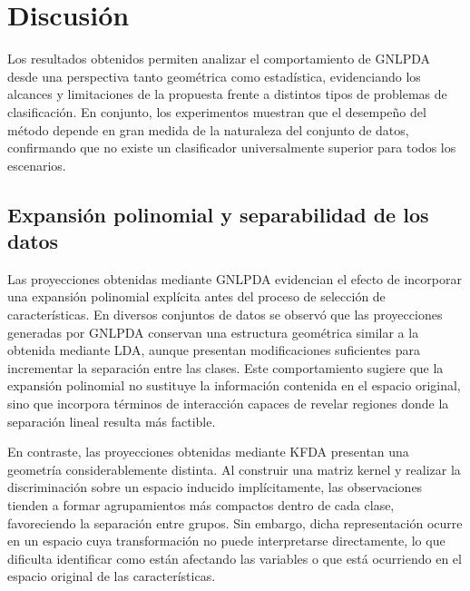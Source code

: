 
\chapter{Discusión}

\label{chap:Discusión}

Los resultados obtenidos permiten analizar el comportamiento de GNLPDA desde una perspectiva tanto geométrica como estadística, evidenciando los alcances y limitaciones de la propuesta frente a distintos tipos de problemas de clasificación. En conjunto, los experimentos muestran que el desempeño del método depende en gran medida de la naturaleza del conjunto de datos, confirmando que no existe un clasificador universalmente superior para todos los escenarios.

\section{Expansión polinomial y separabilidad de los datos}

Las proyecciones obtenidas mediante GNLPDA evidencian el efecto de incorporar una expansión polinomial explícita antes del proceso de selección de características. En diversos conjuntos de datos se observó que las proyecciones generadas por GNLPDA conservan una estructura geométrica similar a la obtenida mediante LDA, aunque presentan modificaciones suficientes para incrementar la separación entre las clases. Este comportamiento sugiere que la expansión polinomial no sustituye la información contenida en el espacio original, sino que incorpora términos de interacción capaces de revelar regiones donde la separación lineal resulta más factible.

En contraste, las proyecciones obtenidas mediante KFDA presentan una geometría considerablemente distinta. Al construir una matriz kernel y realizar la discriminación sobre un espacio inducido implícitamente, las observaciones tienden a formar agrupamientos más compactos dentro de cada clase, favoreciendo la separación entre grupos. Sin embargo, dicha representación ocurre en un espacio cuya transformación no puede interpretarse directamente, lo que dificulta identificar como están afectando las variables o que está ocurriendo en el espacio original de las características.

